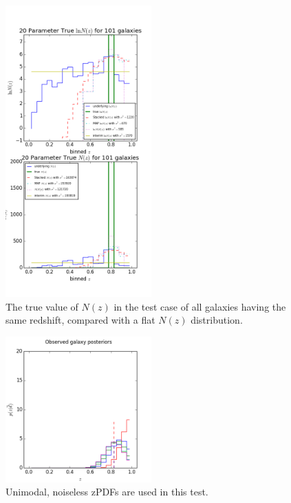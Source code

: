 \documentclass[preprint]{aastex}
\begin{document}
\begin{figure}
\includegraphics[width=0.5\textwidth]{toy/trueNz.png}
\caption{The true value of $N(z)$ in the test case of all galaxies having the 
same redshift, compared with a flat $N(z)$ distribution.}
\label{fig:deltatrueNz}
\end{figure}

\begin{figure}
\includegraphics[width=0.5\textwidth]{toy/samplepzs.png}
\caption{Unimodal, noiseless zPDFs are used in this test.}
\label{fig:toypzs}
\end{figure}
\end{document}

